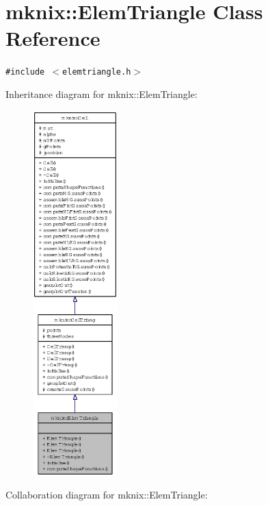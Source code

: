 \hypertarget{classmknix_1_1ElemTriangle}{
\section{mknix::ElemTriangle Class Reference}
\label{classmknix_1_1ElemTriangle}
}
{\tt \#include $<$elemtriangle.h$>$}

Inheritance diagram for mknix::ElemTriangle:\nopagebreak
\begin{figure}[H]
\begin{center}
\leavevmode
\includegraphics[height=400pt]{classmknix_1_1ElemTriangle__inherit__graph}
\end{center}
\end{figure}
Collaboration diagram for mknix::ElemTriangle:\nopagebreak
